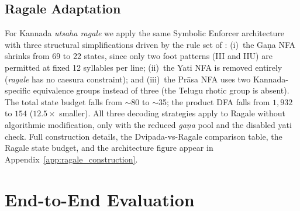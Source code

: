 \documentclass[11pt]{article}
\begin{document}
\subsection{Ragale Adaptation}
\label{sec:ragale_decoding}

For Kannada \textit{utsaha ragale} we apply the same Symbolic Enforcer
architecture with three structural simplifications driven by the rule
set of \citet{venkatachalashastri2008}: (i)~the Ga\d{n}a NFA shrinks
from 69 to 22 states, since only two foot patterns (III and IIU) are
permitted at fixed 12 syllables per line; (ii)~the Yati NFA is removed
entirely (\textit{ragale} has no caesura constraint); and (iii)~the
Pr\=asa NFA uses two Kannada-specific equivalence groups instead of
three (the Telugu rhotic group is absent). The total state budget falls
from $\sim$80 to $\sim$35; the product DFA falls from $1{,}932$ to
$154$ ($12.5\times$ smaller). All three decoding strategies apply to
Ragale without algorithmic modification, only with the reduced
\textit{ga\d{n}a} pool and the disabled yati check. Full
construction details, the Dvipada-vs-Ragale comparison table, the
Ragale state budget, and the architecture figure appear in
Appendix~\ref{app:ragale_construction}.

\section{End-to-End Evaluation}
\label{sec:evaluation}
\end{document}
